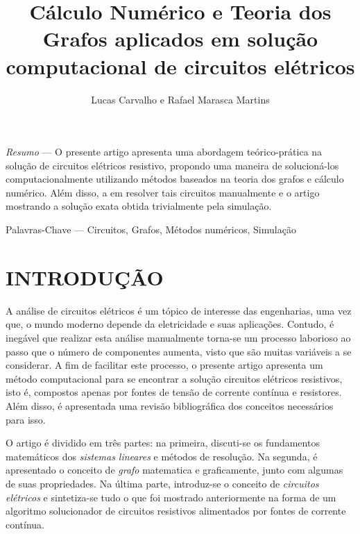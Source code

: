 \documentclass[twocolumn, 10pt]{extarticle}
\begin{document}
\singlespacing

\title{Cálculo Numérico e Teoria dos Grafos aplicados em solução computacional de circuitos elétricos}
\date{}
\author{Lucas Carvalho e Rafael Marasca Martins}

\maketitle

\thispagestyle{empty}

\begin{bfseries}
\small
\textit{Resumo} — O presente artigo apresenta uma abordagem teórico-prática na solução de circuitos elétricos resistivo, propondo uma maneira de solucioná-los computacionalmente utilizando métodos baseados na teoria dos grafos  e cálculo numérico. Além disso, a em resolver tais circuitos manualmente e o artigo mostrando a solução exata obtida trivialmente pela simulação.

\bigskip
Palavras-Chave — Circuitos, Grafos, Métodos numéricos, Simulação
\end{bfseries}

\section{INTRODUÇÃO}

A análise de circuitos elétricos é um tópico de interesse das engenharias, uma vez que, o mundo moderno depende da eletricidade e suas aplicações. Contudo, é inegável que realizar esta análise manualmente torna-se um processo laborioso ao passo que o número de componentes aumenta, visto que são muitas variáveis a se considerar. A fim de facilitar este processo, o presente artigo apresenta um método computacional para se encontrar a solução circuitos elétricos resistivos, isto é, compostos apenas por fontes de tensão de corrente contínua e resistores. Além disso, é apresentada uma revisão bibliográfica dos conceitos necessários para isso.

O artigo é dividido em três partes: na primeira, discuti-se os fundamentos matemáticos dos \textit{sistemas lineares} e métodos de resolução. Na segunda, é apresentado o conceito de \textit{grafo} matematica e graficamente, junto com algumas de suas propriedades. Na última parte, introduz-se o conceito de \textit{circuitos elétricos} e sintetiza-se tudo o que foi mostrado anteriormente na forma de um algoritmo solucionador de circuitos resistivos alimentados por fontes de corrente contínua.
\end{document}
